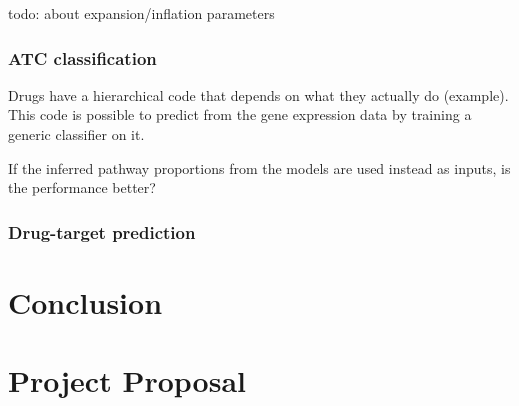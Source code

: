 \documentclass[12pt,a4paper,twoside,openright]{report}
\begin{document}
todo: about expansion/inflation parameters

\subsection{ATC classification}

Drugs have a hierarchical code that depends on what they actually do (example). This code is possible to predict from the gene expression data by training a generic classifier on it.

If the inferred pathway proportions from the models are used instead as inputs, is the performance better?

\subsection{Drug-target prediction}

\chapter{Conclusion}



\appendix

\chapter{Project Proposal}


\end{document}
